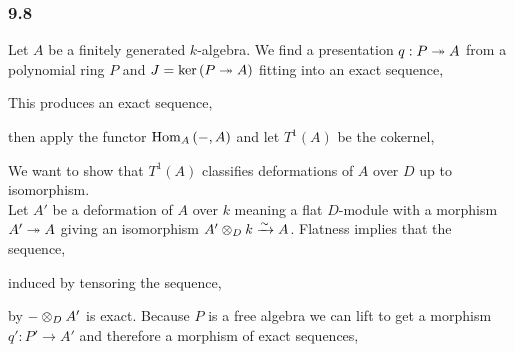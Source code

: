 \documentclass[12pt]{article}
\begin{document}
\subsubsection{9.8}

\newcommand{\Def}[1]{\mathrm{Def}\left( #1 \right)}

Let $A$ be a finitely generated $k$-algebra. We find a presentation $q : P \twoheadrightarrow A$ from a polynomial ring $P$ and $J = \ker{(P \twoheadrightarrow A)}$ fitting into an exact sequence,
\begin{center}
\end{center}
This produces an exact sequence,
\begin{center}
\end{center}
then apply the functor $\mathrm{Hom}_{A} \left( -, A \right)$ and let $T^1(A)$ be the cokernel,
\begin{center}
\end{center}
We want to show that $T^1(A)$ classifies deformations of $A$ over $D$ up to isomorphism.
\bigskip\\
Let $A'$ be a deformation of $A$ over $k$ meaning a flat $D$-module with a morphism $A' \twoheadrightarrow A$ giving an isomorphism $A' \otimes_D k \xrightarrow{\sim} A$. Flatness implies that the sequence,
\begin{center}
\end{center}
induced by tensoring the sequence,
\begin{center}
\end{center}
by $- \otimes_D A'$ is exact. Because $P$ is a free algebra we can lift to get a morphism $q' : P' \to A'$ and therefore a morphism of exact sequences,
\begin{center}
\end{center}
\end{document}
